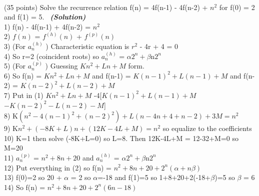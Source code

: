 \documentclass[a4 paper]{article}
\numberwithin{equation}{section}
\newcommand{\problem}[2]{~\\\fbox{\textbf{Problem #1}}\hfill (#2 points)\newline\newline}
\newcommand{\solution}{~\newline\textbf{\textit{(Solution)}} }
\newcommand{\0}{\mathbf{0}}
\begin{document}
\newpage
\problem{2}{35}
Solve the recurrence relation f(n) = 4f(n-1) - 4f(n-2) + $n^2$ for f(0) = 2 and f(1) = 5. 
\solution
\newline\\
1) f(n) - 4f(n-1) + 4f(n-2) = $n^2$
\newline\\
2) $f(n)$ = $f^{(h)}(n)$ + $f^{(p)}(n)$
\newline\\
3) (For $a^{(h)}_n$ ) Characteristic equation is $r^2$ - 4r + 4 = 0
\newline\\
4) So r=2 (coincident roots) so $a^{(h)}_n$ = $\alpha2^n + \beta$n$2^n$
\newline\\
5) (For $a^{(p)}_n$ ) Guessing $Kn^2+Ln+M$ form.
\newline\\
6) So f(n) = $Kn^2+Ln+M$ and f(n-1) = $K(n-1)^2+L(n-1)+M$ and f(n-2) = $K(n-2)^2+L(n-2)+M$
\newline\\
7) Put in (1) $Kn^2+Ln+M$ -4[$K(n-1)^2+L(n-1)+M$ $-K(n-2)^2-L(n-2)-M$]
\newline\\
8) K$(n^2 - 4(n-1)^2 + (n-2)^2) + L(n-4n+4+n-2) + 3M = n^2 $
\newline\\
9) K$n^2 + (-8K+L)n + (12K-4L+M) = n^2 $ so equalize to the coefficients
\newline\\
10) K=1 then solve (-8K+L=0) so L=8. Then 12K-4L+M = 12-32+M=0 so M=20
\newline\\
11) $a^{(p)}_n$ = $n^2+8n+20$ and $a^{(h)}_n$ = $\alpha2^n + \beta$n$2^n$
\newline\\
12) Put everything in (2) so f(n) = $n^2+8n+20 + 2^n(\alpha + n\beta)$
\newline\\
13) f(0)=2 so 20 + $\alpha$ = 2 so $\alpha$=-18 and f(1)=5 so 1+8+20+2(-18+$\beta$)=5 so $\beta$ = 6
\newline\\
14) So f(n) = $n^2+8n+20 + 2^n(6n - 18)$
\newline
\end{document}
